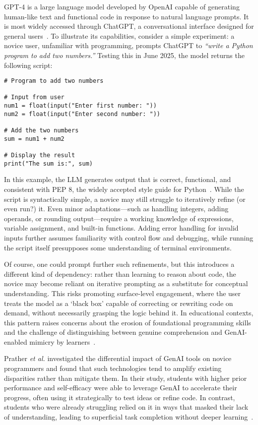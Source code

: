 GPT-4 is a large language model developed by OpenAI capable of generating human-like text and functional code in response to natural language prompts. It is most widely accessed through ChatGPT, a conversational interface designed for general users~\cite{openai_gpt-4_2024}. To illustrate its capabilities, consider a simple experiment: a novice user, unfamiliar with programming, prompts ChatGPT to \textit{``write a Python program to add two numbers.''} Testing this in June 2025, the model returns the following script:

\begin{lstlisting}
# Program to add two numbers

# Input from user
num1 = float(input("Enter first number: "))
num2 = float(input("Enter second number: "))

# Add the two numbers
sum = num1 + num2

# Display the result
print("The sum is:", sum)
\end{lstlisting}

In this example, the LLM generates output that is correct, functional, and consistent with PEP 8, the widely accepted style guide for Python~\cite{van_rossum_pep_2013}. While the script is syntactically simple, a novice may still struggle to iteratively refine (or even run?) it. Even minor adaptations---such as handling integers, adding operands, or rounding output---require a working knowledge of expressions, variable assignment, and built-in functions. Adding error handling for invalid inputs further assumes familiarity with control flow and debugging, while running the script itself presupposes some understanding of terminal environments.

Of course, one could prompt further such refinements, but this introduces a different kind of dependency: rather than learning to reason about code, the novice may become reliant on iterative prompting as a substitute for conceptual understanding. This risks promoting surface-level engagement, where the user treats the model as a `black box' capable of correcting or rewriting code on demand, without necessarily grasping the logic behind it. In educational contexts, this pattern raises concerns about the erosion of foundational programming skills and the challenge of distinguishing between genuine comprehension and GenAI-enabled mimicry by learners~\cite{kazemitabaar_studying_2023}.

Prather \textit{et al.} investigated the differential impact of GenAI tools on novice programmers and found that such technologies tend to amplify existing disparities rather than mitigate them. In their study, students with higher prior performance and self-efficacy were able to leverage GenAI to accelerate their progress, often using it strategically to test ideas or refine code. In contrast, students who were already struggling relied on it in ways that masked their lack of understanding, leading to superficial task completion without deeper learning~\cite{prather_widening_2024}. 

